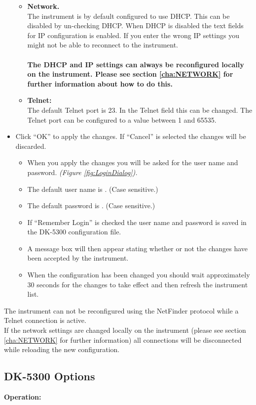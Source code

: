 \begin{itemize}
\begin{itemize}
		\item \textbf{Network.}\\The instrument is by default configured to use DHCP. This can be disabled by un-checking DHCP. When DHCP is disabled the text fields for IP configuration is enabled. If you enter the wrong IP settings you might not be able to reconnect to the instrument.\\\\\textbf{The DHCP and IP settings can always be reconfigured locally on the instrument. Please see section \ref{cha:NETWORK} for further information about how to do this.}
		\item \textbf{Telnet:}\\The default Telnet port is 23. In the Telnet field this can be changed. The Telnet port can be configured to a value between 1 and 65535.
	\end{itemize}
\item Click ``OK'' to apply the changes. If ``Cancel'' is selected the changes will be discarded.
	\begin{itemize}
		\item When you apply the changes you will be asked for the user name and password. \textit{(Figure \ref{fig:LoginDialog}).}
		\item The default user name is \textbf{\DefaultUser}. (Case sensitive.)
		\item The default password is \textbf{\DefaultPass}. (Case sensitive.)
		\item If ``Remember Login'' is checked the user name and password is saved in the DK-5300 configuration file.
		\item A message box will then appear stating whether or not the changes have been accepted by the instrument.
		\item When the configuration has been changed you should wait approximately 30 seconds for the changes to take effect and then refresh the instrument list.
	\end{itemize}
\end{itemize}
The instrument can not be reconfigured using the NetFinder protocol while a Telnet connection is active.\\If the network settings are changed locally on the instrument (please see section \ref{cha:NETWORK} for further information) all connections will be disconnected while reloading the new configuration.
\newpage
\subsection{DK-5300 Options}
\textbf{Operation:}

